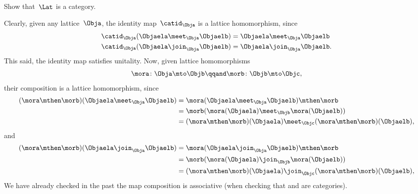\begin{exercise}
    \label{ex:lat_is_cat}
    Show that~$\Lat$ is a category.
\end{exercise}
\begin{solution}
    Clearly, given any lattice~$\Obja$, the identity map~$\catid_\Obja$ is a lattice homomorphism, since
    \begin{equation*}
        \begin{aligned}
            \catid_\Obja(\Objaela \meet_\Obja \Objaelb) & =\Objaela \meet_\Obja \Objaelb  \\
            \catid_\Obja(\Objaela \join_\Obja \Objaelb) & =\Objaela \join_\Obja \Objaelb.
        \end{aligned}
    \end{equation*}
    This said, the identity map satisfies unitality.
    Now, given lattice homomorphisms
    \begin{equation}
        \mora\colon \Obja \mto \Objb \qqand \morb\colon \Objb\mto \Objc,
    \end{equation}
    their composition is a lattice homomorphism, since
    \begin{equation*}
        \begin{aligned}
            (\mora \mthen \morb)(\Objaela \meet_\Obja \Objaelb)
             & = \mora(\Objaela \meet_\Obja \Objaelb) \mthen \morb                         \\
             & = \morb(\mora(\Objaela) \meet_\Objb \mora(\Objaelb))                        \\
             & =(\mora \mthen \morb)(\Objaela) \meet_\Objc (\mora \mthen \morb)(\Objaelb),
        \end{aligned}
    \end{equation*}
    and
    \begin{equation*}
        \begin{aligned}
            (\mora \mthen \morb)(\Objaela \join_\Obja \Objaelb)
             & = \mora(\Objaela \join_\Obja \Objaelb) \mthen \morb                         \\
             & = \morb(\mora(\Objaela) \join_\Objb \mora(\Objaelb))                        \\
             & =(\mora \mthen \morb)(\Objaela) \join_\Objc (\mora \mthen \morb)(\Objaelb),
        \end{aligned}
    \end{equation*}
    We have already checked in the past the map composition is associative (\eg when checking that \Set and \Pos are categories).
\end{solution}

